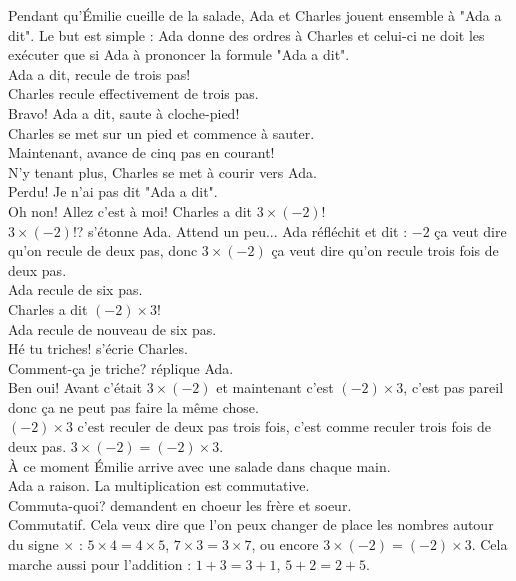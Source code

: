 Pendant qu'Émilie cueille de la salade, Ada et Charles jouent ensemble à "Ada a dit". Le but est simple : Ada donne des ordres à Charles et celui-ci ne doit les exécuter que si Ada à prononcer la formule "Ada a dit".\\
\guillemotleft Ada a dit, recule de trois pas!\guillemotright\\
Charles recule effectivement de trois pas.\\
\guillemotleft Bravo! Ada a dit, saute à cloche-pied!\guillemotright\\
Charles se met sur un pied et commence à sauter.\\
\guillemotleft Maintenant, avance de cinq pas en courant!\guillemotright\\
N'y tenant plus, Charles se met à courir vers Ada.\\
\guillemotleft Perdu! Je n'ai pas dit "Ada a dit".\\
\mdash Oh non! Allez c'est à moi! Charles a dit $3 \times (-2)$!\\
\mdash $3 \times (-2)$!? s'étonne Ada. Attend un peu... Ada réfléchit et dit : $-2$ ça veut dire qu'on recule de deux pas, donc $3 \times (-2)$ ça veut dire qu'on recule trois fois de deux pas.\guillemotright\\
Ada recule de six pas.\\
\guillemotleft Charles a dit $(-2) \times 3$!\guillemotright\\
Ada recule de nouveau de six pas.\\
\guillemotleft Hé tu triches! s'écrie Charles.\\
\mdash Comment-ça je triche? réplique Ada.\\
\mdash Ben oui! Avant c'était $3 \times (-2)$ et maintenant c'est $(-2) \times 3$, c'est pas pareil donc ça ne peut pas faire la même chose.\\
\mdash $(-2) \times 3$ c'est reculer de deux pas trois fois, c'est comme reculer trois fois de deux pas. $3 \times (-2) = (-2) \times 3$.\guillemotright\\
À ce moment Émilie arrive avec une salade dans chaque main.\\
\guillemotleft Ada a raison. La multiplication est commutative.\\
\mdash Commuta-quoi? demandent en choeur les frère et soeur.\\
\mdash Commutatif. Cela veux dire que l'on peux changer de place les nombres autour du signe $\times$ : $5 \times 4 = 4 \times 5$, $7 \times 3 = 3 \times 7$, ou encore $3 \times (-2) = (-2) \times 3$. Cela marche aussi pour l'addition : $1 +3 = 3 + 1$, $5 + 2 = 2 + 5$.\\
